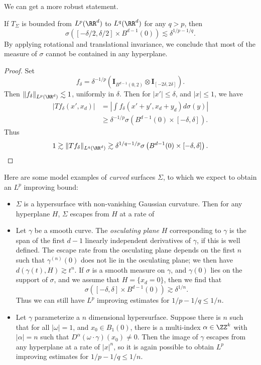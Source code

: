 We can get a more robust statement.

\begin{theorem}
    If $T_\Sigma$ is bounded from $L^p(\RR^d)$ to $L^q(\RR^d)$ for any $q > p$, then
    \[ \sigma \left( [-\delta/2, \delta/2] \times B^{d-1}(0) \right) \lesssim \delta^{1/p - 1/q}. \]
    By applying rotational and translational invariance, we conclude that most of the measure of $\sigma$ cannot be contained in any hyperplane.
\end{theorem}
\begin{proof}
    Set
    \[ f_\delta = \delta^{-1/p} \left( \mathbf{I}_{B^{d-1}(0, 2)} \otimes \mathbf{I}_{[-2\delta,2\delta]} \right). \]
    Then $\| f_\delta \|_{L^p(\RR^d)} \lesssim 1$, uniformly in $\delta$. Then for $|x'| \leq \delta$, and $|x| \leq 1$, we have
    \begin{align*}
        |Tf_\delta(x',x_d)| &= \left| \int f_\delta(x'+y',x_d + y_d) d\sigma(y) \right|\\
        &\geq \delta^{-1/p} \sigma \left( B^{d-1}(0) \times [-\delta,\delta] \right).
    \end{align*}
    Thus
    \[ 1 \gtrsim \| Tf_\delta \|_{L^q(\RR^d)} \gtrsim \delta^{1/q-1/p} \sigma \left( B^{d-1}(0) \times [-\delta,\delta] \right). \qedhere \]
\end{proof}

Here are some model examples of \emph{curved} surfaces $\Sigma$, to which we expect to obtain an $L^p$ improving bound:
%
\begin{itemize}
    \item $\Sigma$ is a hypersurface with non-vanishing Gaussian curvature. Then for any hyperplane $H$, $\Sigma$ escapes from $H$ at a rate of

    \item Let $\gamma$ be a smooth curve. The \emph{osculating plane} $H$ corresponding to $\gamma$ is the span of the first $d-1$ linearly independent derivatives of $\gamma$, if this is well defined. The escape rate from the osculating plane depends on the first $n$ such that $\gamma^{(n)}(0)$ does not lie in the osculating plane; we then have $d(\gamma(t), H) \gtrsim t^n$. If $\sigma$ is a smooth measure on $\gamma$, and $\gamma(0)$ lies on the support of $\sigma$, and we assume that $H = \{ x_d = 0 \}$, then we find that
    \[ \sigma([-\delta,\delta] \times B^{d-1}(0)) \gtrsim \delta^{1/n}. \]
    Thus we can still have $L^p$ improving estimates for $1/p - 1/q \leq 1/n$.

    \item Let $\gamma$ parameterize a $n$ dimensional hypersurface. Suppose there is $n$ such that for all $|\omega| = 1$, and $x_0 \in B_1(0)$, there is a multi-index $\alpha \in \ZZ^k$ with $|\alpha|  = n$ such that $D^\alpha(\omega \cdot \gamma)(x_0) \neq 0$. Then the image of $\gamma$ escapes from any hyperplane at a rate of $|x|^n$, so it is again possible to obtain $L^p$ improving estimates for $1/p - 1/q \leq 1/n$.
\end{itemize}

